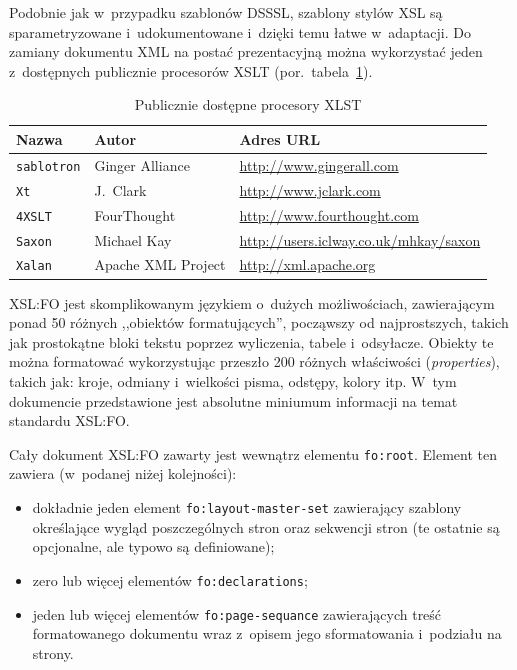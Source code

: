 \documentclass[brudnopis,xodstep]{xmgr}
\begin{document}
Podobnie jak w~przypadku szablonów DSSSL, szablony stylów XSL są
sparametryzowane i~udokumentowane i~dzięki temu łatwe w~adaptacji. Do
zamiany dokumentu XML na postać prezentacyjną można wykorzystać jeden
z~dostępnych publicznie procesorów XSLT
(por.~tabela~\ref{zest:proces:xslt}).

\begin{table}[!htb]
\begin{tabular}{|l|l|l|} \hline
Nazwa & Autor      & Adres URL \\ \hline
\texttt{sablotron} & Ginger Alliance & \url{http://www.gingerall.com} \\ \hline
\texttt{Xt}        & J.~Clark & \url{http://www.jclark.com} \\ \hline
\texttt{4XSLT}     & FourThought & \url{http://www.fourthought.com} \\ \hline
\texttt{Saxon}     & Michael Kay &  \url{http://users.iclway.co.uk/mhkay/saxon} \\ \hline
\texttt{Xalan}     & Apache XML Project & \url{http://xml.apache.org} \\ \hline
\end{tabular}
\caption{Publicznie dostępne procesory XLST\label{zest:proces:xslt}}
\end{table}

XSL:FO jest skomplikowanym językiem o~dużych możliwościach,
zawierającym ponad 50 różnych ,,obiektów formatujących'', począwszy od
najprostszych, takich jak prostokątne bloki tekstu poprzez wyliczenia,
tabele i~odsyłacze. Obiekty te można formatować wykorzystując przeszło
200 różnych właściwości (\emph{properties\/}), takich jak: kroje,
odmiany i~wielkości pisma, odstępy, kolory itp.  
W~tym dokumencie przedstawione jest absolutne miniumum informacji 
na temat standardu XSL:FO.

Cały dokument XSL:FO zawarty jest wewnątrz elementu \texttt{fo:root}.
Element ten zawiera (w~podanej niżej kolejności):
\begin{itemize}
\item dokładnie jeden element \texttt{fo:layout-master-set} zawierający
  szablony określające wygląd poszczególnych stron oraz sekwencji
  stron (te ostatnie są opcjonalne, ale typowo są definiowane);
\item zero lub więcej elementów \texttt{fo:declarations};
\item jeden lub więcej elementów \texttt{fo:page-sequance}
 zawierających treść formatowanego dokumentu wraz z~opisem
 jego sformatowania i~podziału na strony.
\end{itemize}
\end{document}
